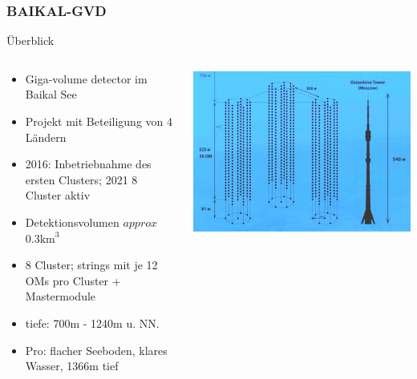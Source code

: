 \documentclass[aspectratio=1610, 9pt]{beamer}
\begin{document}
\begin{frame}\frametitle{BAIKAL-GVD}
  \begin{block}{\"Uberblick}
    \begin{columns}
    \begin{column}[c]{0.45\textwidth}
      \begin{itemize}
        \item Giga-volume detector im Baikal See
        \item Projekt mit Beteiligung von 4 L\"andern
        \item 2016: Inbetriebnahme des ersten Clusters; 2021 8 Cluster aktiv
        \item Detektionsvolumen $approx$ $0.3 \text{km}^{3}$
        \item 8 Cluster; strings mit je 12 OMs pro Cluster + Mastermodule
        \item tiefe: 700m - 1240m u. NN.
        \item Pro: flacher Seeboden, klares Wasser, 1366m tief 
      \end{itemize}
    \end{column}
    \begin{column}[c]{0.45\textwidth}
      \includegraphics{images/baikal1.png}
    \end{column}
    \end{columns}
  \end{block}
\end{frame}
\end{document}
